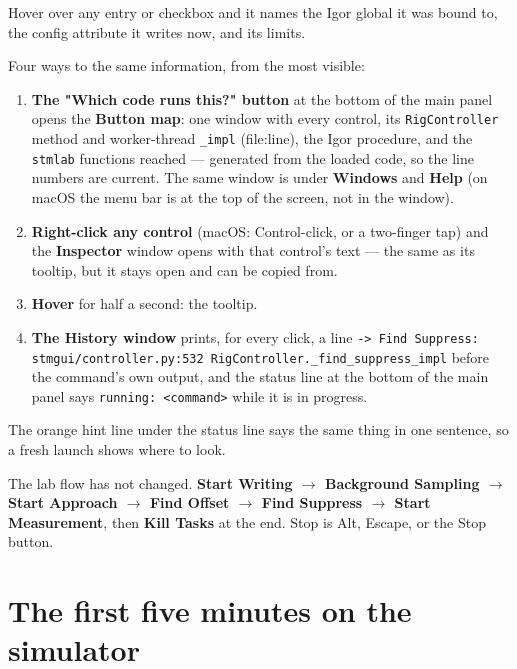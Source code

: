 Hover over any entry or checkbox and it names the Igor global it was bound to, the config attribute it writes now, and its limits.

Four ways to the same information, from the most visible:

\begin{enumerate}[leftmargin=*]
\item \textbf{The "Which code runs this?" button} at the bottom of the main panel opens the \textbf{Button map}: one window with every control, its \texttt{Rig\discretionary{}{}{}Controller} method and worker-thread \texttt{\_\discretionary{}{}{}impl} (file:line), the Igor procedure, and the \texttt{stmlab} functions reached --- generated from the loaded code, so the line numbers are current. The same window is under \textbf{Windows} and \textbf{Help} (on macOS the menu bar is at the top of the screen, not in the window).
\item \textbf{Right-click any control} (macOS: Control-click, or a two-finger tap) and the \textbf{Inspector} window opens with that control's text --- the same as its tooltip, but it stays open and can be copied from.
\item \textbf{Hover} for half a second: the tooltip.
\item \textbf{The History window} prints, for every click, a line \texttt{-> Find Suppress: stmgui/\discretionary{}{}{}controller.\discretionary{}{}{}py:532 Rig\discretionary{}{}{}Controller.\discretionary{}{}{}\_\discretionary{}{}{}find\_\discretionary{}{}{}suppress\_\discretionary{}{}{}impl} before the command's own output, and the status line at the bottom of the main panel says \texttt{running: <command>} while it is in progress.
\end{enumerate}

The orange hint line under the status line says the same thing in one sentence, so a fresh launch shows where to look.

\begin{keybox}
The lab flow has not changed. \textbf{Start Writing $\rightarrow$ Background Sampling $\rightarrow$ Start Approach $\rightarrow$ Find Offset $\rightarrow$ Find Suppress $\rightarrow$ Start Measurement}, then \textbf{Kill Tasks} at the end. Stop is Alt, Escape, or the Stop button.
\end{keybox}

\section{The first five minutes on the simulator}

